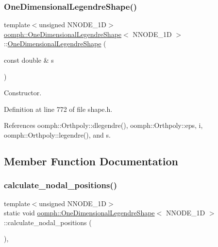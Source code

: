 \subsubsection{\texorpdfstring{One\+Dimensional\+Legendre\+Shape()}{OneDimensionalLegendreShape()}}
{\footnotesize\ttfamily template$<$unsigned N\+N\+O\+D\+E\+\_\+1D$>$ \\
\hyperlink{classoomph_1_1OneDimensionalLegendreShape}{oomph\+::\+One\+Dimensional\+Legendre\+Shape}$<$ N\+N\+O\+D\+E\+\_\+1D $>$\+::\hyperlink{classoomph_1_1OneDimensionalLegendreShape}{One\+Dimensional\+Legendre\+Shape} (\begin{DoxyParamCaption}\item[{const double \&}]{s }\end{DoxyParamCaption})\hspace{0.3cm}{\ttfamily [inline]}}



Constructor. 



Definition at line 772 of file shape.\+h.



References oomph\+::\+Orthpoly\+::dlegendre(), oomph\+::\+Orthpoly\+::eps, i, oomph\+::\+Orthpoly\+::legendre(), and s.



\subsection{Member Function Documentation}
\mbox{\label{classoomph_1_1OneDimensionalLegendreShape_ae33d86bf57e03bdb3dffcd248ed881cd}} 
\subsubsection{\texorpdfstring{calculate\+\_\+nodal\+\_\+positions()}{calculate\_nodal\_positions()}}
{\footnotesize\ttfamily template$<$unsigned N\+N\+O\+D\+E\+\_\+1D$>$ \\
static void \hyperlink{classoomph_1_1OneDimensionalLegendreShape}{oomph\+::\+One\+Dimensional\+Legendre\+Shape}$<$ N\+N\+O\+D\+E\+\_\+1D $>$\+::calculate\+\_\+nodal\+\_\+positions (\begin{DoxyParamCaption}{ }\end{DoxyParamCaption})\hspace{0.3cm}{\ttfamily [inline]}, {\ttfamily [static]}}



